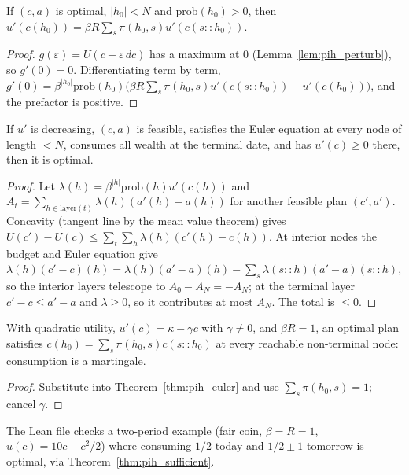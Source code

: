 \begin{theorem}
\label{thm:pih_euler}
\leanok
{}
If $(c,a)$ is optimal, $|h_0| < N$ and $\mathrm{prob}(h_0) > 0$, then
$u'(c(h_0)) = \beta R\sum_s\pi(h_0, s)u'(c(s :: h_0))$.
\end{theorem}
\begin{proof}
\leanok
$g(\varepsilon) = U(c + \varepsilon\,dc)$ has a maximum at $0$ (Lemma~\ref{lem:pih_perturb}), so $g'(0) = 0$.
Differentiating term by term, $g'(0) = \beta^{|h_0|}\mathrm{prob}(h_0)\bigl(\beta R\sum_s\pi(h_0,s)u'(c(s::h_0)) -
u'(c(h_0))\bigr)$, and the prefactor is positive.
\end{proof}

\begin{theorem}[Sufficiency]
\label{thm:pih_sufficient}
\leanok
{}
If $u'$ is decreasing, $(c,a)$ is feasible, satisfies the Euler equation at every node of length $< N$, consumes
all wealth at the terminal date, and has $u'(c) \ge 0$ there, then it is optimal.
\end{theorem}
\begin{proof}
\leanok
Let $\lambda(h) = \beta^{|h|}\mathrm{prob}(h)u'(c(h))$ and $A_t = \sum_{h \in \mathrm{layer}(t)}\lambda(h)(a'(h) - a(h))$ for
another feasible plan $(c', a')$. Concavity (tangent line by the mean value theorem) gives
$U(c') - U(c) \le \sum_t\sum_h\lambda(h)(c'(h) - c(h))$. At interior nodes the budget and Euler equation give
$\lambda(h)(c' - c)(h) = \lambda(h)(a' - a)(h) - \sum_s\lambda(s::h)(a' - a)(s::h)$, so the interior layers
telescope to $A_0 - A_N = -A_N$; at the terminal layer $c' - c \le a' - a$ and $\lambda \ge 0$, so it contributes at
most $A_N$. The total is $\le 0$.
\end{proof}

\begin{theorem}
\label{thm:pih_hall}
\leanok
{}
With quadratic utility, $u'(c) = \kappa - \gamma c$ with $\gamma \ne 0$, and $\beta R = 1$, an optimal plan satisfies
$c(h_0) = \sum_s\pi(h_0,s)c(s::h_0)$ at every reachable non-terminal node: consumption is a martingale.
\end{theorem}
\begin{proof}
\leanok
Substitute into Theorem~\ref{thm:pih_euler} and use $\sum_s\pi(h_0,s) = 1$; cancel $\gamma$.
\end{proof}

\begin{remark}
The Lean file checks a two-period example (fair coin, $\beta = R = 1$, $u(c) = 10c - c^2/2$) where consuming
$1/2$ today and $1/2 \pm 1$ tomorrow is optimal, via Theorem~\ref{thm:pih_sufficient}.
\end{remark}

